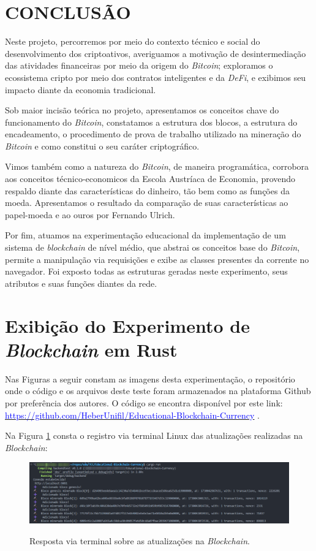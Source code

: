 \section*{CONCLUSÃO}
Neste projeto, percorremos por meio do contexto técnico e social do desenvolvimento dos criptoativos, averiguamos a motivação de desintermediação das atividades financeiras por meio da origem do \textit{Bitcoin}; exploramos o ecossistema cripto por meio dos contratos inteligentes e da \textit{DeFi}, e exibimos seu impacto diante da economia tradicional.

Sob maior incisão teórica no projeto, apresentamos os conceitos chave do funcionamento do \textit{Bitcoin}, constatamos a estrutura dos blocos, a estrutura do encadeamento, o procedimento de prova de trabalho utilizado na mineração do \textit{Bitcoin} e como constitui o seu caráter criptográfico.

Vimos também como a natureza do \textit{Bitcoin}, de maneira programática, corrobora aos conceitos técnico-economicos da Escola Austríaca de Economia, provendo respaldo diante das características do dinheiro, tão bem como as funções da moeda. Apresentamos o resultado da comparação de suas características ao papel-moeda e ao ouros por Fernando Ulrich.

Por fim, atuamos na experimentação educacional da implementação de um sistema de \textit{blockchain} de nível médio, que abstrai os conceitos base do \textit{Bitcoin}, permite a manipulação via requisições e exibe as classes presentes da corrente no navegador. Foi exposto todas as estruturas geradas neste experimento, seus atributos e suas funções diantes da rede.

\section*{Exibição do Experimento de \textit{Blockchain} em Rust}
Nas Figuras a seguir constam as imagens desta experimentação, o repositório onde o código e os arquivos deste teste foram armazenados na plataforma Github por preferência dos autores. O código se encontra disponível por este link:
\href{https://github.com/HeberUnifil/Educational-Blockchain-Currency}{\textcolor{blue}{https://github.com/HeberUnifil/Educational-Blockchain-Currency}} .

Na Figura \ref*{fig:terminal} consta o registro via terminal Linux das atualizações realizadas na \textit{Blockchain}:

\begin{figure} [h]
	\centering
	\caption{Resposta via terminal sobre as atualizações na \textit{Blockchain}.}
	\includegraphics[width=1\linewidth]{../images/terminal-blockchain.png}
	\label{fig:terminal}

\end{figure}

